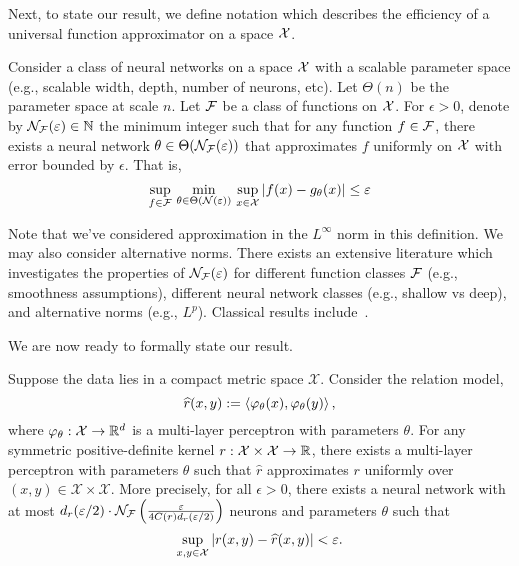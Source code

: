 Next, to state our result, we define notation which describes the efficiency of a universal function approximator on a space ${\mathcal{X}}$.
\begin{definition}\label{def:univ_approx_efficiency}
	Consider a class of neural networks on a space ${\mathcal{X}}$ with a scalable parameter space (e.g., scalable width, depth, number of neurons, etc). Let $\Theta(n)$ be the parameter space at scale $n$. Let ${\mathcal{F}}$ be a class of functions on ${\mathcal{X}}$. For $\epsilon > 0$, denote by ${\mathcal{N}}_{\mathcal{F}}(\varepsilon) \in \mathbb{N}$ the minimum integer such that for any function $f \in {\mathcal{F}}$, there exists a neural network $\theta \in \Theta({\mathcal{N}}_{\mathcal{F}}(\varepsilon))$ that approximates $f$ uniformly on ${\mathcal{X}}$ with error bounded by $\epsilon$. That is,
	\begin{equation*}
		\sup_{f \in \calF} \, \min_{\theta \in \Theta(\calN(\epsilon))} \,  \sup_{x \in \calX} \abs{f(x) - g_\theta(x)} \leq \epsilon
	\end{equation*}
\end{definition}

Note that we've considered approximation in the $L^\infty$ norm in this definition. We may also consider alternative norms. There exists an extensive literature which investigates the properties of ${\mathcal{N}}_{\mathcal{F}}(\varepsilon)$ for different function classes ${\mathcal{F}}$ (e.g., smoothness assumptions), different neural network classes (e.g., shallow vs deep), and alternative norms (e.g., $L^p$). Classical results include~\parencite{cybenkoApproximationSuperpositions1989,barronUniversalApproximation1993,hornikMultilayerFeedforward1989}.

We are now ready to formally state our result.

\begin{theorem}\label{theorem:symmetric_inner_prod_rels_func_class}
	\hphantom{~}

	Suppose the data lies in a compact metric space \(\mathcal{X}\). Consider the relation model,
	\begin{equation*}
		\hat{r}(x, y) := \iprod{\phi_{\theta}(x)}{\phi_{\theta}(y)},
	\end{equation*}
	where $\varphi_{\theta}: {\mathcal{X}} \to \mathbb{R}^d$ is a multi-layer perceptron with parameters $\theta$.
	For any symmetric positive-definite kernel $r: {\mathcal{X}} \times {\mathcal{X}} \to \mathbb{R}$, there exists a multi-layer perceptron with parameters $\theta$ such that $\hat{r}$ approximates $r$ uniformly over \((x,y) \in \mathcal{X}\times\mathcal{X}\). More precisely, for all \(\epsilon > 0\), there exists a neural network with at most $d_r(\varepsilon / 2) \cdot {\mathcal{N}}_{\mathcal{F}}\left(\frac{\varepsilon}{4 C(r) d_r(\varepsilon / 2)}\right)$ neurons and parameters $\theta$ such that
    \[\sup_{x,y \in \mathcal{X}}{\left\lvert r(x,y) - \widehat{r}(x,y)\right\rvert} < \varepsilon.\]
\end{theorem}

